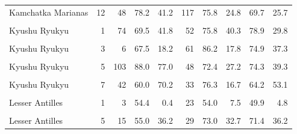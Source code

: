 \begin{ThreePartTable}
\begin{longtable}[t]{lrrrrrrrrr}
Kamchatka Marianas & 12 & 48 & 78.2 & 41.2 & 117 & 75.8 & 24.8 & 69.7 & 25.7\\
\cellcolor{gray!6}{Kamchatka Marianas} & \cellcolor{gray!6}{13} & \cellcolor{gray!6}{55} & \cellcolor{gray!6}{68.0} & \cellcolor{gray!6}{36.5} & \cellcolor{gray!6}{108} & \cellcolor{gray!6}{75.5} & \cellcolor{gray!6}{27.1} & \cellcolor{gray!6}{61.6} & \cellcolor{gray!6}{31.1}\\
Kyushu Ryukyu & 1 & 74 & 69.5 & 41.8 & 52 & 75.8 & 40.3 & 78.9 & 29.8\\
\cellcolor{gray!6}{Kyushu Ryukyu} & \cellcolor{gray!6}{2} & \cellcolor{gray!6}{25} & \cellcolor{gray!6}{80.0} & \cellcolor{gray!6}{40.0} & \cellcolor{gray!6}{43} & \cellcolor{gray!6}{77.6} & \cellcolor{gray!6}{13.1} & \cellcolor{gray!6}{76.6} & \cellcolor{gray!6}{16.0}\\
Kyushu Ryukyu & 3 & 6 & 67.5 & 18.2 & 61 & 86.2 & 17.8 & 74.9 & 37.3\\
\cellcolor{gray!6}{Kyushu Ryukyu} & \cellcolor{gray!6}{4} & \cellcolor{gray!6}{28} & \cellcolor{gray!6}{77.5} & \cellcolor{gray!6}{26.2} & \cellcolor{gray!6}{43} & \cellcolor{gray!6}{84.9} & \cellcolor{gray!6}{24.6} & \cellcolor{gray!6}{93.0} & \cellcolor{gray!6}{49.0}\\
Kyushu Ryukyu & 5 & 103 & 88.0 & 77.0 & 48 & 72.4 & 27.2 & 74.3 & 39.3\\
\cellcolor{gray!6}{Kyushu Ryukyu} & \cellcolor{gray!6}{6} & \cellcolor{gray!6}{25} & \cellcolor{gray!6}{126.0} & \cellcolor{gray!6}{94.0} & \cellcolor{gray!6}{39} & \cellcolor{gray!6}{80.4} & \cellcolor{gray!6}{19.0} & \cellcolor{gray!6}{81.7} & \cellcolor{gray!6}{70.0}\\
Kyushu Ryukyu & 7 & 42 & 60.0 & 70.2 & 33 & 76.3 & 16.7 & 64.2 & 53.1\\
\cellcolor{gray!6}{Kyushu Ryukyu} & \cellcolor{gray!6}{8} & \cellcolor{gray!6}{36} & \cellcolor{gray!6}{43.4} & \cellcolor{gray!6}{30.8} & \cellcolor{gray!6}{23} & \cellcolor{gray!6}{62.1} & \cellcolor{gray!6}{37.6} & \cellcolor{gray!6}{49.5} & \cellcolor{gray!6}{35.5}\\
Lesser Antilles & 1 & 3 & 54.4 & 0.4 & 23 & 54.0 & 7.5 & 49.9 & 4.8\\
\cellcolor{gray!6}{Lesser Antilles} & \cellcolor{gray!6}{3} & \cellcolor{gray!6}{10} & \cellcolor{gray!6}{38.1} & \cellcolor{gray!6}{31.9} & \cellcolor{gray!6}{20} & \cellcolor{gray!6}{57.7} & \cellcolor{gray!6}{24.0} & \cellcolor{gray!6}{59.4} & \cellcolor{gray!6}{26.7}\\
Lesser Antilles & 5 & 15 & 55.0 & 36.2 & 29 & 73.0 & 32.7 & 71.4 & 36.2\\

\end{longtable}
\end{ThreePartTable}

